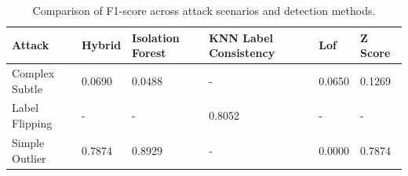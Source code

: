 \begin{table}[H]
\centering
\caption{Comparison of F1-score across attack scenarios and detection methods.}
\label{tab:f1_method_comparison}
\begin{tabular}{llllll}
\hline
Attack & Hybrid & Isolation Forest & KNN Label Consistency & Lof & Z Score \\
\hline
Complex Subtle & 0.0690 & 0.0488 & - & 0.0650 & 0.1269 \\
Label Flipping & - & - & 0.8052 & - & - \\
Simple Outlier & 0.7874 & 0.8929 & - & 0.0000 & 0.7874 \\
\hline
\end{tabular}
\end{table}
